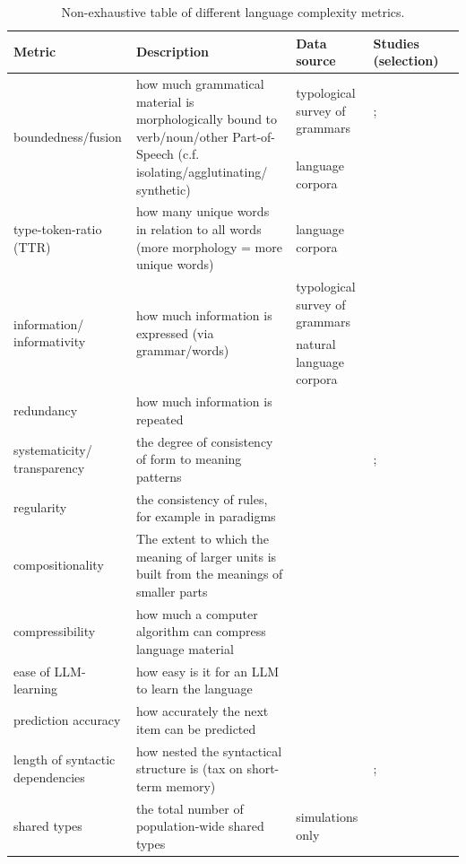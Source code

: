 \documentclass[USenglish]{article}
\begin{document}
\begin{table}[h]
    \centering
    \begin{tabular}{p{3cm}p{3.5cm}p{2.5cm}p{2cm}p{2cm}}  %
        \toprule
        \textbf{Metric} & \textbf{Description} & \textbf{Data source} & \textbf{Studies \newline(selection)} \\ 
        \midrule
       \multirow{2}{2.5cm}{boundedness/fusion}   & \multirow{2}{3.5cm}{how much grammatical material is morphologically bound to verb/noun/other Part-of-Speech (c.f. isolating/agglutinating/ synthetic) } & typological survey of grammars & \cite{grambank_release}; \cite{shcherbakova2023societies} \\ 
        \cmidrule{3-4}
         &  & language corpora \newline \\ 
         \midrule
        type-token-ratio (TTR) & how many unique words in relation to all words (more morphology = more unique words) & language corpora &  \cite{kettunen2014can}\\ 
               \midrule
     \multirow{2}{3cm}{information/ informativity}     & \multirow{2}{3.5cm}{how much information is expressed (via grammar/words)} & typological survey of grammars & \cite{shcherbakova2023societies} \\
       \cmidrule{3-4}
      &  & natural language corpora \\    \midrule
redundancy  & how much information is repeated &&  \cite{leufkens2023measuring}\\    \midrule
systematicity/ transparency  & the degree of consistency of form to meaning patterns && \cite{raviv2019larger}; \cite{hengeveld2018transparent} \\    \midrule
regularity & the consistency of rules, for example in paradigms & & \cite{round2022cognition}\\    \midrule
compositionality  & The extent to which the meaning of larger units is built from the meanings of smaller parts &  &\cite{wray2007consequences} \\    \midrule
compressibility  & how much a computer algorithm can compress language material & & \cite{juola1998measuring} \\    \midrule
ease of LLM-learning  & how easy is it for an LLM to learn the language & & \cite{koplenig2023languages}  \\    \midrule

prediction accuracy  & how accurately the next item can be predicted && \cite{frank2011insensitivity} \\    \midrule
length of syntactic dependencies  &  how nested the syntactical structure is (tax on short-term memory) && \cite{gibson1998linguistic}; \citet{liu2008dependency} \\    
\midrule
shared types & the total number of population-wide shared types & simulations only & \citet{spike2017population}\\
\bottomrule
    \end{tabular}
    \caption{Non-exhaustive table of different language complexity metrics.}
    \label{tab:complex_metrics}
\end{table}
\end{document}
